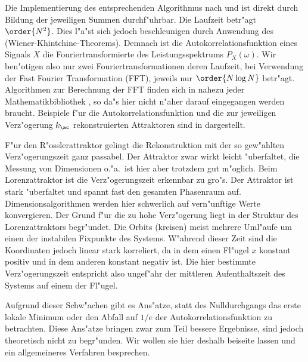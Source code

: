 Die Implementierung des entsprechenden Algorithmus nach  und
 ist direkt durch Bildung der jeweiligen Summen durchf"uhrbar. Die Laufzeit
betr"agt $\order{N^2}$. Dies l"a"st sich jedoch beschleunigen durch Anwendung des
\begriff(Wiener-Khintchine-Theorems). Demnach ist die Autokorrelationsfunktion eines
Signals $X$ die Fouriertransformierte des Leistungsspektrums $P_X(\omega)$. Wir ben"otigen
also nur zwei Fouriertransformationen deren Laufzeit, bei Verwendung der Fast Fourier
Transformation (FFT), jeweils nur $\order{N\log N}$ betr"agt.  Algorithmen zur Berechnung
der FFT finden sich in nahezu jeder Mathematikbibliothek \cite{numerical-recipes}, so da"s
hier nicht n"aher darauf eingegangen werden braucht. Beispiele f"ur die
Autokorrelationsfunktion und die zur jeweiligen Verz"ogerung $k_\ac$ rekonstruierten
Attraktoren sind in  dargestellt.  

F"ur den R"osslerattraktor gelingt die Rekonstruktion mit der so gew"ahlten
Verz"ogerungszeit ganz passabel. Der Attraktor zwar wirkt leicht "uberfaltet, die Messung
von Dimensionen o."a.\ ist hier aber trotzdem gut m"oglich. Beim Lorenzattraktor ist die
Verz"ogerungszeit erkennbar zu gro"s. Der Attraktor ist stark "uberfaltet und spannt fast
den gesamten Phasenraum auf. Dimensionsalgorithmen werden hier schwerlich auf vern"unftige
Werte konvergieren. Der Grund f"ur die zu hohe Verz"ogerung liegt in der Struktur des
Lorenzattraktors begr"undet. Die Orbits \naja(kreisen) meist mehrere Uml"aufe um einen der
instabilen Fixpunkte des Systems. W"ahrend dieser Zeit sind die Koordinaten jedoch linear
stark korreliert, da in dem einen Fl"ugel $x$ konstant positiv und in dem anderen konstant
negativ ist. Die hier bestimmte Verz"ogerungszeit entspricht also ungef"ahr der mittleren
Aufenthaltszeit des Systems auf einem der Fl"ugel.

Aufgrund dieser Schw"achen gibt es Ans"atze, statt des Nulldurchgangs das erste lokale
Minimum oder den Abfall auf $1/e$ der Autokorrelationsfunktion zu betrachten. Diese
Ans"atze bringen zwar zum Teil bessere Ergebnisse, sind jedoch theoretisch nicht zu
begr"unden. Wir wollen sie hier deshalb beiseite lassen und ein allgemeineres Verfahren
besprechen.

